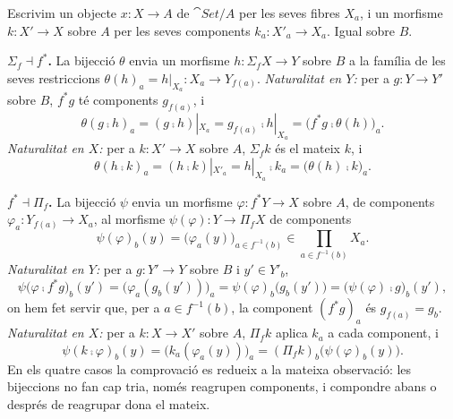 \begin{solucio}
Escrivim un objecte $x\colon X\to A$ de $\cat{Set}/A$ per les seves fibres $X_a$, i un morfisme $k\colon X'\to X$ sobre $A$ per les seves components $k_a\colon X'_a\to X_a$. Igual sobre $B$.

\textbf{$\Sigma_f\dashv f^{*}$.} La bijecció $\theta$ envia un morfisme $h\colon\Sigma_f X\to Y$ sobre $B$ a la família de les seves restriccions $\theta(h)_a=h|_{X_a}\colon X_a\to Y_{f(a)}$. \emph{Naturalitat en $Y$:} per a $g\colon Y\to Y'$ sobre $B$, $f^{*}g$ té components $g_{f(a)}$, i
\[
\theta(g\comp h)_a=(g\comp h)|_{X_a}=g_{f(a)}\comp h|_{X_a}=\bigl(f^{*}g\comp\theta(h)\bigr)_a.
\]
\emph{Naturalitat en $X$:} per a $k\colon X'\to X$ sobre $A$, $\Sigma_f k$ és el mateix $k$, i
\[
\theta(h\comp k)_a=(h\comp k)|_{X'_a}=h|_{X_a}\comp k_a=\bigl(\theta(h)\comp k\bigr)_a.
\]

\textbf{$f^{*}\dashv\Pi_f$.} La bijecció $\psi$ envia un morfisme $\varphi\colon f^{*}Y\to X$ sobre $A$, de components $\varphi_a\colon Y_{f(a)}\to X_a$, al morfisme $\psi(\varphi)\colon Y\to\Pi_f X$ de components
\[
\psi(\varphi)_b(y)=\bigl(\varphi_a(y)\bigr)_{a\in f^{-1}(b)}\in\prod_{a\in f^{-1}(b)}X_a.
\]
\emph{Naturalitat en $Y$:} per a $g\colon Y'\to Y$ sobre $B$ i $y'\in Y'_b$,
\[
\psi\bigl(\varphi\comp f^{*}g\bigr)_b(y')=\bigl(\varphi_a(g_b(y'))\bigr)_{a}=\psi(\varphi)_b\bigl(g_b(y')\bigr)=\bigl(\psi(\varphi)\comp g\bigr)_b(y'),
\]
on hem fet servir que, per a $a\in f^{-1}(b)$, la component $(f^{*}g)_a$ és $g_{f(a)}=g_b$. \emph{Naturalitat en $X$:} per a $k\colon X\to X'$ sobre $A$, $\Pi_f k$ aplica $k_a$ a cada component, i
\[
\psi(k\comp\varphi)_b(y)=\bigl(k_a(\varphi_a(y))\bigr)_{a}=(\Pi_f k)_b\bigl(\psi(\varphi)_b(y)\bigr).
\]
En els quatre casos la comprovació es redueix a la mateixa observació: les bijeccions no fan cap tria, només reagrupen components, i compondre abans o després de reagrupar dona el mateix.
\end{solucio}
